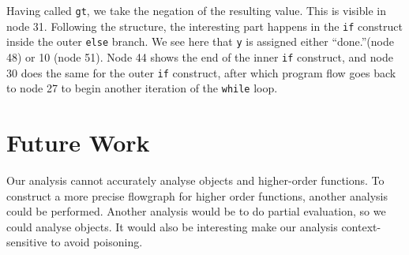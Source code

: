 \documentclass[a4paper,10pt]{article}
\begin{document}
 Having called \texttt{gt}, we take the negation of the resulting value. This is visible in node 31.
 Following the structure, the interesting part happens in the \texttt{if} construct inside the outer \texttt{else} branch. We see here that \texttt{y} is assigned either ``done.''(node 48) or 10 (node 51).
 Node 44 shows the end of the inner \texttt{if} construct, and node 30 does the same for the outer \texttt{if} construct, after which program flow goes back to node 27 to begin another iteration of the \texttt{while} loop.
 
 \section{Future Work}
 Our analysis cannot accurately analyse objects and higher-order functions. 
 To construct a more precise flowgraph for higher order functions, another analysis could be performed.
 Another analysis would be to do partial evaluation, so we could analyse objects.
 It would also be interesting make our analysis context-sensitive to avoid poisoning.
 
 
 
 
 
\end{document}
